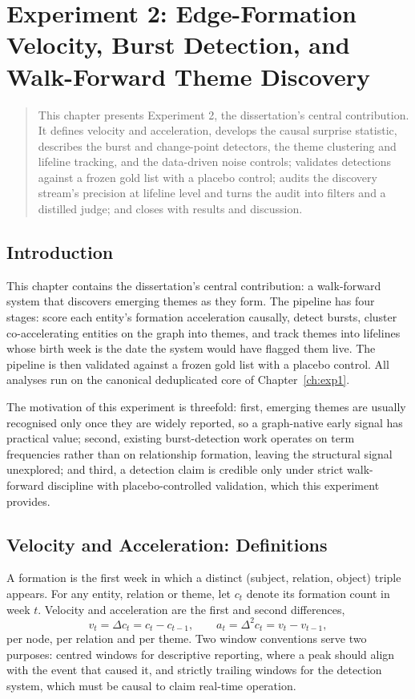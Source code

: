 \documentclass[a4paper,12pt]{report}
\newenvironment{microabstract}{\begin{quotation}\noindent}{\end{quotation}}
\begin{document}
\chapter{Experiment 2: Edge-Formation Velocity, Burst Detection, and Walk-Forward Theme Discovery}
\label{ch:exp2}
\begin{microabstract}
This chapter presents Experiment 2, the dissertation's central
contribution. It defines velocity and acceleration, develops the causal
surprise statistic, describes the burst and change-point detectors, the
theme clustering and lifeline tracking, and the data-driven noise
controls; validates detections against a frozen gold list with a
placebo control; audits the discovery stream's precision at lifeline
level and turns the audit into filters and a distilled judge; and
closes with results and discussion.
\end{microabstract}

\section{Introduction}
This chapter contains the dissertation's central contribution: a walk-forward
system that discovers emerging themes as they form. The pipeline has four
stages: score each entity's formation acceleration causally, detect bursts,
cluster co-accelerating entities on the graph into themes, and track themes
into lifelines whose birth week is the date the system would have flagged them
live. The pipeline is then validated against a frozen gold list with a placebo
control. All analyses run on the canonical deduplicated core of
Chapter~\ref{ch:exp1}.

The motivation of this experiment is threefold: first, emerging themes are
usually recognised only once they are widely reported, so a graph-native
early signal has practical value; second, existing burst-detection work
operates on term frequencies rather than on relationship formation, leaving
the structural signal unexplored; and third, a detection claim is credible
only under strict walk-forward discipline with placebo-controlled validation,
which this experiment provides.

\section{Velocity and Acceleration: Definitions}
A formation is the first week in which a distinct
(subject, relation, object) triple appears. For any entity, relation or theme,
let $c_t$ denote its formation count in week $t$. Velocity and acceleration
are the first and second differences,
\begin{equation}
v_t = \Delta c_t = c_t - c_{t-1}, \qquad
a_t = \Delta^2 c_t = v_t - v_{t-1},
\label{eq:veldef}
\end{equation}
per node, per relation and per theme. Two window conventions serve two
purposes: centred windows for descriptive reporting, where a peak
should align with the event that caused it, and strictly trailing
windows for the detection system, which must be causal to claim real-time
operation.
\end{document}
